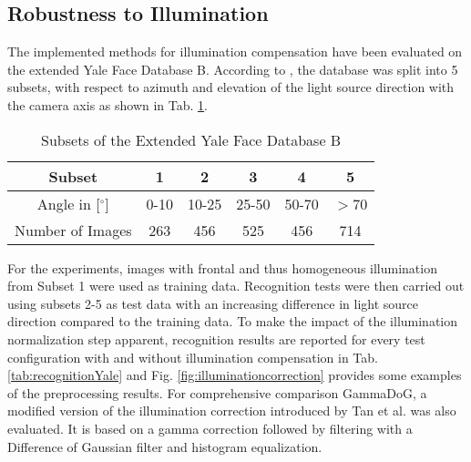 \subsection{Robustness to Illumination}
\label{ssec:EvalIllumination}
The implemented methods for illumination compensation have been evaluated on the extended Yale Face Database B.
According to \cite{Georghiades01}, the database was split into 5 subsets, with respect to azimuth and elevation of the light source direction with the camera axis as shown in Tab. \ref{YaleSubsets}.
\begin{table}[tb]
\caption{Subsets of the Extended Yale Face Database B}
\label{YaleSubsets}
\begin{center}
\begin{tabular}{c|c|c|c|c|c}
Subset & 1 & 2 & 3 & 4 & 5\\
\hline
Angle in [$^\circ$]  &0-10 & 10-25 & 25-50& 50-70 & $>$70\\
Number of Images & 263 & 456 &525 &456 &714\\ 
\end{tabular}
\end{center}
\end{table}
For the experiments, images with frontal and thus homogeneous illumination from  Subset 1 were used as training data.
Recognition tests were then carried out using subsets 2-5 as test data with an increasing difference in light source direction compared to the training data.
To make the impact of the illumination normalization step apparent, recognition results are reported for 
every test configuration with and without illumination compensation in Tab. \ref{tab:recognitionYale} and Fig. \ref{fig:illuminationcorrection} provides some examples of the preprocessing results.
For comprehensive comparison GammaDoG, a modified version of the illumination correction introduced by Tan et al. \cite{Tan2010} was also evaluated.
It is based on a gamma correction followed by filtering with a Difference of Gaussian filter and histogram equalization.
